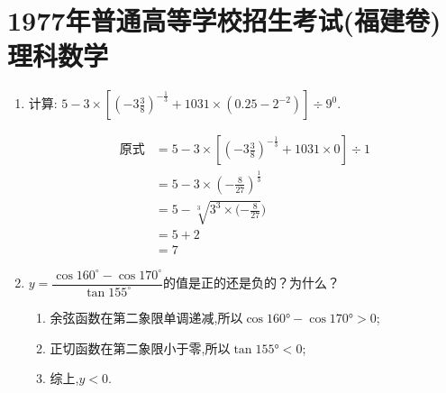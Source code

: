 \section[1977年高考数学试卷及答案(福建卷)理科]{1977年普通高等学校招生考试(福建卷)\\\Huge{理科数学}}

\begin{questions}
	\question
	\begin{enumerate}[label=(\arabic*)]
		\item 计算: \( 5 - 3 \times \left[(-3\frac38)^{-\frac13} + 1031 \times (0.25 - 2^{-2})\right] \div 9^0 \).
		      \begin{solution}
			      \begin{align*}
				      \text{原式} & = 5 - 3 \times \left[ (-3\frac38)^{-\frac13} + 1031 \times 0 \right] \div 1 \\
				                & = 5 - 3 \times (-\frac{8}{27})^{\frac13}                                    \\
				                & = 5 - \sqrt[3]{3^3 \times (-\frac{8}{27}})                                  \\
				                & = 5 + 2                                                                     \\
				                & = 7
			      \end{align*}
		      \end{solution}

		\item \( y = \dfrac{\cos{160^\circ} - \cos{170^\circ}}{\tan{155^\circ}} \)的值是正的还是负的？为什么？
		      \begin{solution}
			      \begin{center}
			      \end{center}

			      \begin{enumerate}[label=\protect\circled{\arabic*}]
				      \item 余弦函数在第二象限单调递减,所以$\cos\ang{160} - \cos\ang{170} > 0$;
				      \item 正切函数在第二象限小于零,所以$\tan\ang{155} < 0$;
				      \item 综上,$y<0$.
			      \end{enumerate}
		      \end{solution}


\end{enumerate}
\end{questions}
